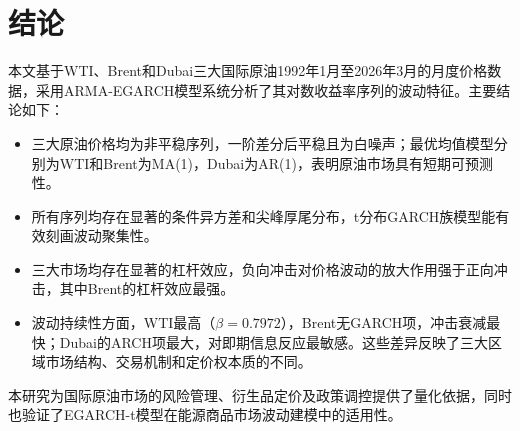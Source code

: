 \documentclass[12pt,a4paper]{ctexart}
\begin{document}
\section{结论}

本文基于WTI、Brent和Dubai三大国际原油1992年1月至2026年3月的月度价格数据，采用ARMA-EGARCH模型系统分析了其对数收益率序列的波动特征。主要结论如下：

\begin{itemize}
\item 三大原油价格均为非平稳序列，一阶差分后平稳且为白噪声；最优均值模型分别为WTI和Brent为MA(1)，Dubai为AR(1)，表明原油市场具有短期可预测性。
\item 所有序列均存在显著的条件异方差和尖峰厚尾分布，t分布GARCH族模型能有效刻画波动聚集性。
\item 三大市场均存在显著的杠杆效应，负向冲击对价格波动的放大作用强于正向冲击，其中Brent的杠杆效应最强。
\item 波动持续性方面，WTI最高（$\beta=0.7972$），Brent无GARCH项，冲击衰减最快；Dubai的ARCH项最大，对即期信息反应最敏感。这些差异反映了三大区域市场结构、交易机制和定价权本质的不同。
\end{itemize}

本研究为国际原油市场的风险管理、衍生品定价及政策调控提供了量化依据，同时也验证了EGARCH-t模型在能源商品市场波动建模中的适用性。






\end{document}
